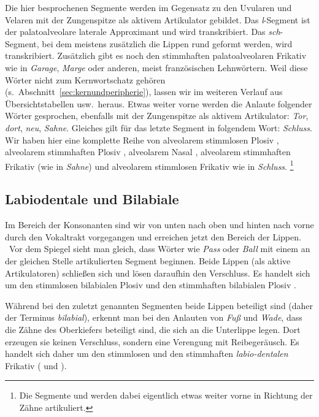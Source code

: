 Die hier besprochenen Segmente werden im Gegensatz zu den Uvularen und Velaren mit der Zungenspitze als aktivem Artikulator gebildet.
Das \textit{l}-Segment ist der palatoalveolare laterale Approximant und wird \textipa{[l]} transkribiert.
Das \textit{sch}-Segment, bei dem meistens zusätzlich die Lippen rund geformt werden, wird \textipa{[S]} transkribiert.
Zusätzlich gibt es noch den stimmhaften palatoalveolaren Frikativ \textipa{[Z]} wie in \textit{Garage}, \textit{Marge} oder anderen, meist französischen Lehnwörtern.
Weil diese Wörter nicht zum Kernwortschatz gehören (s.\ Abschnitt~\ref{sec:kernundperipherie}), lassen wir \textipa{[Z]} im weiteren Verlauf aus Übersichtstabellen usw.\ heraus.
Etwas weiter vorne werden die Anlaute folgender Wörter gesprochen, ebenfalls mit der Zungenspitze als aktivem Artikulator: \textit{Tor}, \textit{dort}, \textit{neu}, \textit{Sahne}.
Gleiches gilt für das letzte Segment in folgendem Wort: \textit{Schluss}.
Wir haben hier eine komplette Reihe von alveolarem stimmlosen Plosiv \textipa{[t]}, alveolarem stimmhaften Plosiv \textipa{[d]}, alveolarem Nasal \textipa{[n]}, alveolarem stimmhaften Frikativ \textipa{[z]} (wie in \textit{Sahne}) und alveolarem stimmlosen Frikativ \textipa{[s]} wie in \textit{Schluss}.%
\footnote{Die Segmente \textipa{[s]} und \textipa{[z]} werden dabei eigentlich etwas weiter vorne in Richtung der Zähne artikuliert.}

\subsection{Labiodentale und Bilabiale}


Im Bereich der Konsonanten sind wir von unten nach oben und hinten nach vorne durch den Vokaltrakt vorgegangen und erreichen jetzt den Bereich der Lippen.
\TuBegin~Vor dem Spiegel sieht man gleich, dass Wörter wie \textit{Pass} oder \textit{Ball} mit einem an der gleichen Stelle artikulierten Segment beginnen.
Beide Lippen (als aktive Artikulatoren) schließen sich und lösen daraufhin den Verschluss.
Es handelt sich um den stimmlosen bilabialen Plosiv \textipa{[p]} und den stimmhaften bilabialen Plosiv \textipa{[b]}.

Während bei den zuletzt genannten Segmenten beide Lippen beteiligt sind (daher der Terminus \textit{bilabial}), erkennt man bei den Anlauten von \textit{Fuß} und \textit{Wade}, dass die Zähne des Oberkiefers beteiligt sind, die sich an die Unterlippe legen.
Dort erzeugen sie keinen Verschluss, sondern eine Verengung mit Reibegeräusch.
Es handelt sich daher um den stimmlosen und den stimmhaften \textit{labio-dentalen} Frikativ (\textipa{[f]} und \textipa{[v]}).

